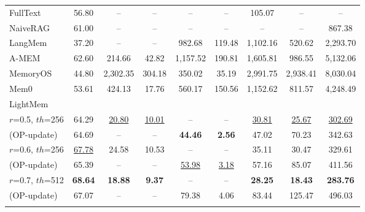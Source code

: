 \begin{table}[t]
{\begin{tabular}{@{}lcccccccc@{}}
\rowcolor{gptbar}\multicolumn{9}{c}{\openailogo\ \textbf{GPT-4o-mini}}\\
\midrule
\rowcolor{gptgray} FullText          & 56.80 & --      & --     & --  & --  & 105.07 & --  & -- \\
\rowcolor{gptgray} NaiveRAG          & 61.00 & --      & --     & --  & --  & -- & --  & 867.38 \\
\rowcolor{gptgray} LangMem          & 37.20 & --      & --     & 982.68  & 119.48  & 1,102.16 & 520.62  & 2,293.70 \\
\rowcolor{gptgray} A-MEM            & 62.60 & 214.66  & 42.82  & 1,157.52& 190.81  & 1,605.81 & 986.55 & 5,132.06 \\
\rowcolor{gptgray} MemoryOS         & 44.80 & 2,302.35& 304.18 & 350.02  & 35.19   & 2,991.75 & 2,938.41& 8,030.04 \\
\rowcolor{gptgray} Mem0             & 53.61 & 424.13  & 17.76  & 560.17  & 150.56  & 1,152.62 & 811.57  & 4,248.49 \\
\hdashline
\rowcolor{gptgray} 
LightMem                  & & & & & & & &\\
\rowcolor{gptgray}
$r$=0.5, $th$=256 & 64.29 & \underline{20.80} & \underline{10.01} & -- & -- & \underline{30.81} & \underline{25.67} & \underline{302.69} \\
\rowcolor{gptgray} (OP-update) & 64.69 & -- & -- & \textbf{44.46} & \textbf{2.56} & 47.02 & 70.23 & 342.63 \\
\rowcolor{gptgray} 
$r$=0.6, $th$=256 & \underline{67.78} & 24.58 & 10.53 & -- & -- & 35.11 & 30.47 & 329.61 \\
\rowcolor{gptgray} (OP-update) & 65.39 & -- & -- & \underline{53.98} & \underline{3.18} & 57.16 & 85.07 & 411.56 \\
\rowcolor{gptgray} 
 $r$=0.7, $th$=512 & \textbf{68.64} & \textbf{18.88} & \textbf{9.37} & -- & -- & \textbf{28.25} & \textbf{18.43} & \textbf{283.76} \\
 \rowcolor{gptgray} (OP-update) & 67.07 & -- & -- & 79.38 & 4.06 & 83.44 & 125.47 & 496.03 \\

\addlinespace[0.4ex]
\midrule


\end{tabular}}
\end{table}
